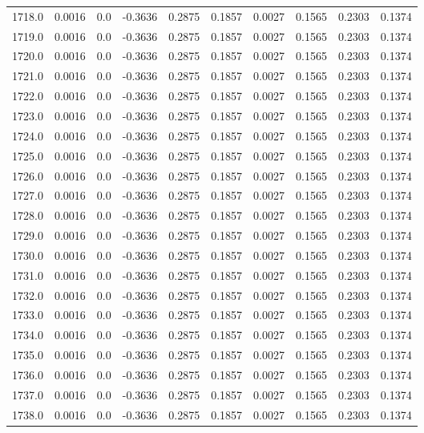 \begin{longtable}{lrrrrrrrrr}
1718.0 & 0.0016 & 0.0 & -0.3636 & 0.2875 & 0.1857 & 0.0027 & 0.1565 & 0.2303 & 0.1374 \\
1719.0 & 0.0016 & 0.0 & -0.3636 & 0.2875 & 0.1857 & 0.0027 & 0.1565 & 0.2303 & 0.1374 \\
1720.0 & 0.0016 & 0.0 & -0.3636 & 0.2875 & 0.1857 & 0.0027 & 0.1565 & 0.2303 & 0.1374 \\
1721.0 & 0.0016 & 0.0 & -0.3636 & 0.2875 & 0.1857 & 0.0027 & 0.1565 & 0.2303 & 0.1374 \\
1722.0 & 0.0016 & 0.0 & -0.3636 & 0.2875 & 0.1857 & 0.0027 & 0.1565 & 0.2303 & 0.1374 \\
1723.0 & 0.0016 & 0.0 & -0.3636 & 0.2875 & 0.1857 & 0.0027 & 0.1565 & 0.2303 & 0.1374 \\
1724.0 & 0.0016 & 0.0 & -0.3636 & 0.2875 & 0.1857 & 0.0027 & 0.1565 & 0.2303 & 0.1374 \\
1725.0 & 0.0016 & 0.0 & -0.3636 & 0.2875 & 0.1857 & 0.0027 & 0.1565 & 0.2303 & 0.1374 \\
1726.0 & 0.0016 & 0.0 & -0.3636 & 0.2875 & 0.1857 & 0.0027 & 0.1565 & 0.2303 & 0.1374 \\
1727.0 & 0.0016 & 0.0 & -0.3636 & 0.2875 & 0.1857 & 0.0027 & 0.1565 & 0.2303 & 0.1374 \\
1728.0 & 0.0016 & 0.0 & -0.3636 & 0.2875 & 0.1857 & 0.0027 & 0.1565 & 0.2303 & 0.1374 \\
1729.0 & 0.0016 & 0.0 & -0.3636 & 0.2875 & 0.1857 & 0.0027 & 0.1565 & 0.2303 & 0.1374 \\
1730.0 & 0.0016 & 0.0 & -0.3636 & 0.2875 & 0.1857 & 0.0027 & 0.1565 & 0.2303 & 0.1374 \\
1731.0 & 0.0016 & 0.0 & -0.3636 & 0.2875 & 0.1857 & 0.0027 & 0.1565 & 0.2303 & 0.1374 \\
1732.0 & 0.0016 & 0.0 & -0.3636 & 0.2875 & 0.1857 & 0.0027 & 0.1565 & 0.2303 & 0.1374 \\
1733.0 & 0.0016 & 0.0 & -0.3636 & 0.2875 & 0.1857 & 0.0027 & 0.1565 & 0.2303 & 0.1374 \\
1734.0 & 0.0016 & 0.0 & -0.3636 & 0.2875 & 0.1857 & 0.0027 & 0.1565 & 0.2303 & 0.1374 \\
1735.0 & 0.0016 & 0.0 & -0.3636 & 0.2875 & 0.1857 & 0.0027 & 0.1565 & 0.2303 & 0.1374 \\
1736.0 & 0.0016 & 0.0 & -0.3636 & 0.2875 & 0.1857 & 0.0027 & 0.1565 & 0.2303 & 0.1374 \\
1737.0 & 0.0016 & 0.0 & -0.3636 & 0.2875 & 0.1857 & 0.0027 & 0.1565 & 0.2303 & 0.1374 \\
1738.0 & 0.0016 & 0.0 & -0.3636 & 0.2875 & 0.1857 & 0.0027 & 0.1565 & 0.2303 & 0.1374 \\

\end{longtable}

